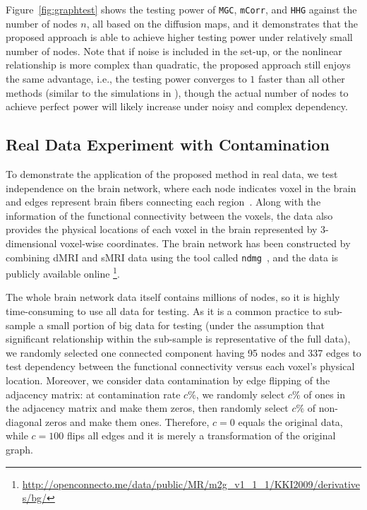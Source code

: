 \documentclass[12pt]{article}
\theoremstyle{definition}
\begin{document}
	Figure~\ref{fig:graphtest} shows the testing power of \texttt{MGC}, \texttt{mCorr}, and \texttt{HHG} against the number of nodes $n$, all based on the diffusion maps, and it demonstrates that the proposed approach is able to achieve higher testing power under relatively small number of nodes. Note that if noise is included in the set-up, or the nonlinear relationship is more complex than quadratic, the proposed approach still enjoys the same advantage, i.e., the testing power converges to $1$ faster than all other methods (similar to the simulations in \cite{shen2016discovering}), though the actual number of nodes to achieve perfect power will likely increase under noisy and complex dependency.
	
	
	\subsection{Real Data Experiment with Contamination}
	\label{ssec:real}
	
	To demonstrate the application of the proposed method in real data, we test independence on the brain network, where each node indicates voxel in the brain and edges represent brain fibers connecting each region~\citep{kiar2016ndmg}. Along with the information of the functional connectivity between the voxels, the data also provides the physical locations of each voxel in the brain represented by 3-dimensional voxel-wise coordinates. The brain network has been constructed by combining dMRI and sMRI data using the tool called \texttt{ndmg}~\citep{kiar2016science}, and the data is publicly available online \footnote{\url{http://openconnecto.me/data/public/MR/m2g_v1_1_1/KKI2009/derivatives/bg/}}.
	
	The whole brain network data itself contains millions of nodes, so it is highly time-consuming to use all data for testing. As it is a common practice to sub-sample a small portion of big data for testing (under the assumption that significant relationship within the sub-sample is representative of the full data), we randomly selected one connected component having 95 nodes and 337 edges to test dependency between the functional connectivity versus each voxel's physical location. Moreover, we consider data contamination by edge flipping of the adjacency matrix: at contamination rate $c \%$, we randomly select $c \%$ of ones in the adjacency matrix and make them zeros, then randomly select $c \%$ of non-diagonal zeros and make them ones. Therefore, $c=0$ equals the original data, while $c=100$ flips all edges and it is merely a transformation of the original graph.
	
\end{document}
